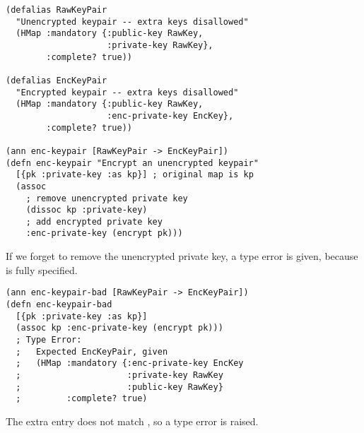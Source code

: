 \begin{exmp}
\begin{verbatim}
(defalias RawKeyPair
  "Unencrypted keypair -- extra keys disallowed"
  (HMap :mandatory {:public-key RawKey,
                    :private-key RawKey},
        :complete? true))

(defalias EncKeyPair
  "Encrypted keypair -- extra keys disallowed"
  (HMap :mandatory {:public-key RawKey,
                    :enc-private-key EncKey},
        :complete? true))

(ann enc-keypair [RawKeyPair -> EncKeyPair])
(defn enc-keypair "Encrypt an unencrypted keypair"
  [{pk :private-key :as kp}] ; original map is kp
  (assoc 
    ; remove unencrypted private key
    (dissoc kp :private-key)
    ; add encrypted private key
    :enc-private-key (encrypt pk)))
\end{verbatim}
\label{example:circleci}
\end{exmp}

If we forget to remove the unencrypted private key,
a type error is given, because  is fully specified.
%
\begin{verbatim}
(ann enc-keypair-bad [RawKeyPair -> EncKeyPair])
(defn enc-keypair-bad
  [{pk :private-key :as kp}]
  (assoc kp :enc-private-key (encrypt pk)))
  ; Type Error:
  ;   Expected EncKeyPair, given 
  ;   (HMap :mandatory {:enc-private-key EncKey
  ;                     :private-key RawKey
  ;                     :public-key RawKey}
  ;         :complete? true)
\end{verbatim}
The extra  entry does not match , so a type error
is raised.


